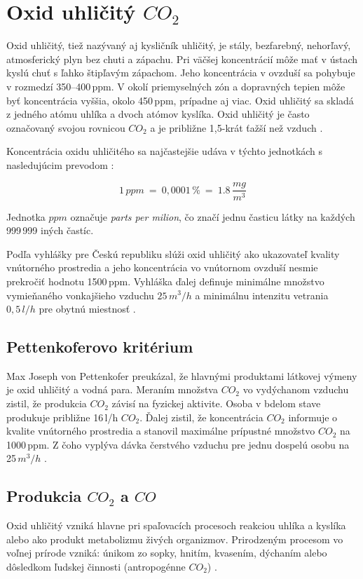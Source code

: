 \section{Oxid uhličitý $CO_2$}
Oxid uhličitý, tiež nazývaný aj kysličník uhličitý, je stály, bezfarebný, nehorľavý, atmosferický plyn bez chuti a zápachu. Pri väčšej koncentrácií môže mať v ústach kyslú chuť s ľahko štipľavým zápachom. Jeho koncentrácia v ovzduší sa pohybuje v rozmedzí 350--400\,ppm. V okolí priemyselných zón a dopravných tepien môže byť koncentrácia vyššia, okolo 450\,ppm, prípadne aj viac. Oxid uhličitý sa skladá z jedného atómu uhlíka a dvoch atómov kyslíka. Oxid uhličitý je často označovaný svojou rovnicou $CO_2$ a je približne 1,5-krát ťažší než vzduch \cite{ucebnicaChemie}.

Koncentrácia oxidu uhličitého sa najčastejšie udáva v týchto jednotkách s nasledujúcim prevodom \cite{niosh}: 

\begin{equation}
    1\,ppm\ = \ 0,0001\,\% \ = \ 1.8\,\frac{mg}{m^3}
\end{equation}

Jednotka $ppm$ označuje \textit{parts per milion}, čo značí jednu časticu látky na každých 999\,999 iných častíc.

Podľa vyhlášky pre Českú republiku slúži oxid uhličitý ako ukazovateľ kvality vnútorného prostredia a jeho koncentrácia vo vnútornom ovzduší nesmie prekročiť hodnotu 1500\,ppm. Vyhláška ďalej definuje minimálne množstvo vymieňaného vonkajšieho vzduchu $25\,m^3/h $ a minimálnu intenzitu vetrania $0,5\,l/h$ pre obytnú miestnosť \cite{VyhlaskaKvalitaVnutornehoOvzdusiaCO}. 

\subsection{Pettenkoferovo kritérium}
Max Joseph von Pettenkofer preukázal, že hlavnými produktami látkovej výmeny je oxid uhličitý a vodná para. Meraním množstva $CO_2$ vo vydýchanom vzduchu zistil, že produkcia $CO_2$ závisí na fyzickej aktivite. Osoba v bdelom stave produkuje približne 16\,l/h $CO_2$. Ďalej zistil, že koncentrácia $CO_2$ informuje o kvalite vnútorného prostredia a stanovil maximálne prípustné množstvo $CO_2$ na 1000\,ppm. Z čoho vyplýva dávka čerstvého vzduchu pre jednu dospelú osobu na 25\,$m^3/h$ \cite{PettenkoferovoKriterium}.

\subsection{Produkcia $CO_2$ a $CO$}
Oxid uhličitý vzniká hlavne pri spaľovacích procesoch reakciou uhlíka a kyslíka alebo ako produkt metabolizmu živých organizmov. Prirodzeným procesom vo voľnej prírode vzniká: únikom zo sopky, hnitím, kvasením, dýchaním alebo dôsledkom ľudskej činnosti (antropogénne $CO_2$) \cite{AtmosferaAKlima}.

